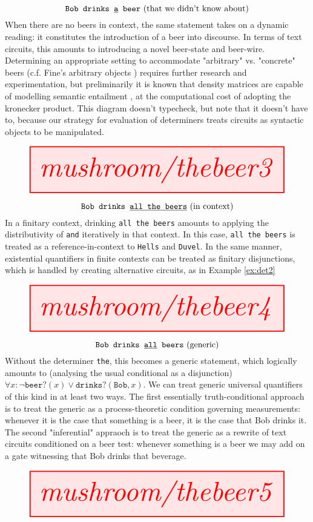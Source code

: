 \begin{myboxR}
\begin{example}\label{ex:det3}
\[\texttt{Bob drinks \underline{a} beer} \text{ (that we didn't know about)}\]
When there are no beers in context, the same statement takes on a dynamic reading: it constitutes the introduction of a beer into discourse. In terms of text circuits, this amounts to introducing a novel beer-state and beer-wire. Determining an appropriate setting to accommodate "arbitrary" vs. "concrete" beers (c.f. Fine's arbitrary objects \citep{urquhartFineArbitraryObjects2020}) requires further research and experimentation, but preliminarily it is known that density matrices are capable of modelling semantic entailment \citep{balkirDistributionalSentenceEntailment2015}, at the computational cost of adopting the kronecker product. This diagram doesn't typecheck, but note that it doesn't have to, because our strategy for evaluation of determiners treats circuits as syntactic objects to be manipulated.
\end{example}
\[\resizebox{\textwidth}{!}{\tikzfig{mushroom/thebeer3}}\]
\end{myboxR}

\begin{myboxR}
\begin{example}\label{ex:quant2}
\[\texttt{Bob drinks \underline{all the beers}} \text{ (in context)}\]
In a finitary context, drinking \texttt{all the beers} amounts to applying the distributivity of \texttt{and} iteratively in that context. In this case, \texttt{all the beers} is treated as a reference-in-context to \texttt{Hells} and \texttt{Duvel}. In the same manner, existential quantifiers in finite contexts can be treated as finitary disjunctions, which is handled by creating alternative circuits, as in Example \ref{ex:det2}
\end{example}
\[\resizebox{\textwidth}{!}{\tikzfig{mushroom/thebeer4}}\]
\end{myboxR}

\begin{myboxR}
\begin{example}\label{ex:quant2}
\[\texttt{Bob drinks \underline{all} beers} \text{ (generic)}\]
Without the determiner \texttt{the}, this becomes a generic statement, which logically amounts to (analysing the usual conditional as a disjunction) $\forall x: \neg\texttt{beer?}(x) \vee \texttt{drinks?}(\texttt{Bob},x)$. We can treat generic universal quantifiers of this kind in at least two ways. The first essentially truth-conditional approach is to treat the generic as a process-theoretic condition governing measurements: whenever it is the case that something is a beer, it is the case that Bob drinks it. The second "inferential" appraoch is to treat the generic as a rewrite of text circuits conditioned on a beer test: whenever something is a beer we may add on a gate witnessing that Bob drinks that beverage.
\end{example}
\[\resizebox{\textwidth}{!}{\tikzfig{mushroom/thebeer5}}\]
\end{myboxR}



